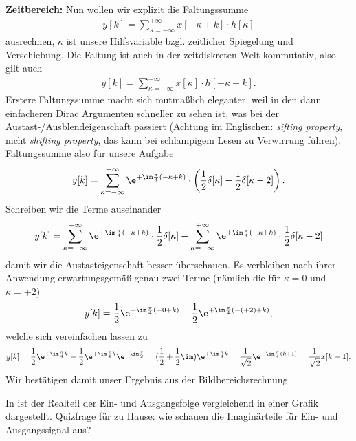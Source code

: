 \begin{ExCalc}
\textbf{Zeitbereich:}
Nun wollen wir explizit die Faltungssumme
\begin{align}
y[k] = \sum_{\kappa=-\infty}^{+\infty} x[-\kappa + k] \cdot h[\kappa]
\end{align}
ausrechnen, $\kappa$ ist unsere Hilfsvariable bzgl. zeitlicher Spiegelung und
Verschiebung.
%
Die Faltung ist auch in der zeitdiskreten Welt kommutativ, also gilt auch
\begin{align}
y[k] = \sum_{\kappa=-\infty}^{+\infty} x[\kappa] \cdot h[-\kappa + k].
\end{align}
%
Erstere Faltungssumme macht sich mutmaßlich eleganter, weil in den dann einfacheren
Dirac Argumenten schneller zu sehen ist, was bei der Austast-/Ausblendeigenschaft passiert
(Achtung im Englischen:
\textit{sifting property}, nicht \textit{shifting property}, das kann bei schlampigem
Lesen zu Verwirrung führen).
%
Faltungssumme also für unsere Aufgabe
%
\begin{align}
y[k] = \sum_{\kappa=-\infty}^{+\infty} \e^{+\im\frac{\pi}{4} (-\kappa+k)} \cdot
\left(\frac{1}{2}\delta[\kappa] - \frac{1}{2}\delta[\kappa-2]\right).
\end{align}
%
Schreiben wir die Terme auseinander
\begin{align}
y[k] =
\sum_{\kappa=-\infty}^{+\infty} \e^{+\im\frac{\pi}{4} (-\kappa+k)} \cdot \frac{1}{2}\delta[\kappa]
-
\sum_{\kappa=-\infty}^{+\infty} \e^{+\im\frac{\pi}{4} (-\kappa+k)} \cdot \frac{1}{2}\delta[\kappa-2]
\end{align}
damit wir die Austasteigenschaft besser überschauen.
%
Es verbleiben nach ihrer Anwendung erwartungsgemäß genau zwei Terme (nämlich die für
$\kappa=0$ und $\kappa=+2$)
\begin{align}
y[k] =
\frac{1}{2} \e^{+\im\frac{\pi}{4} (-0+k)}
-
\frac{1}{2} \e^{+\im\frac{\pi}{4} (-(+2)+k)},
\end{align}
welche sich vereinfachen lassen zu
\begin{align}
y[k] =
\frac{1}{2} \e^{+\im\frac{\pi}{4} k}
-
\frac{1}{2} \e^{+\im\frac{\pi}{4} k} \e^{-\im\frac{\pi}{2}} =
(\frac{1}{2} + \frac{1}{2} \im )\e^{+\im\frac{\pi}{4} k}
=
\frac{1}{\sqrt{2}} \e^{+\im \frac{\pi}{4} (k+1)}=
\frac{1}{\sqrt{2}} x[k+1].
\end{align}
Wir bestätigen damit unser Ergebnis aus der Bildbereichsrechnung.

In  ist der Realteil der Ein- und Ausgangsfolge vergleichend
in einer Grafik dargestellt. Quizfrage für zu Hause: wie schauen die Imaginärteile
für Ein- und Ausgangssignal aus?
\end{ExCalc}
